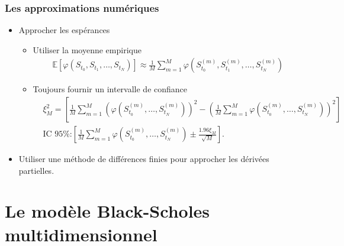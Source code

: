 \documentclass[10pt,color,leqno]{beamer}
\theoremstyle{plain}
\def\E{{\mathbb E}}
\def\inv#1{\frac{1}{#1}}
\begin{document}
\begin{frame}
  \frametitle{Les approximations numériques}

  \begin{itemize}
    \item Approcher les espérances
    \begin{itemize}
      \item Utiliser la moyenne empirique
      \begin{align*}
        \E[ \varphi(S_{t_0}, S_{t_1}, \dots, S_{t_N}) ] \approx \frac{1}{M} \sum_{m=1}^M \varphi(S^{(m)}_{t_0}, S^{(m)}_{t_1}, \dots, S^{(m)}_{t_N})
      \end{align*}
      \item Toujours fournir un intervalle de confiance
      \begin{align*}
      & \xi_M^2 = \left[\inv{M} \sum_{m=1}^M (\varphi(S_{t_0}^{(m)},  \dots, S_{t_N}^{(m)}))^2 - \left(\inv{M} \sum_{m=1}^M \varphi(S_{t_0}^{(m)},  \dots, S_{t_N}^{(m)}) \right)^2 \right] \\
      &\text{IC 95\%:} \left[ \inv{M} \sum_{m=1}^M \varphi(S_{t_0}^{(m)},  \dots, S_{t_N}^{(m)}) \pm \frac{1.96 \xi_M}{\sqrt{M}} \right].
    \end{align*}
    \end{itemize}
      \item Utiliser une méthode de différences finies pour approcher les dérivées partielles.
  \end{itemize}



\end{frame}


\section{Le modèle Black-Scholes multidimensionnel}
\end{document}
